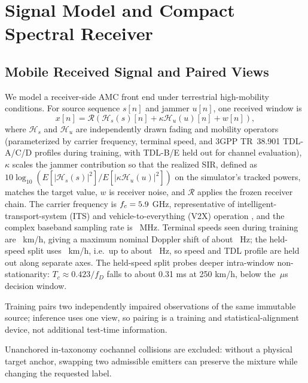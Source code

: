 \documentclass[letterpaper,journal]{IEEEtran}
\begin{document}
\section{Signal Model and Compact Spectral Receiver}
\subsection{Mobile Received Signal and Paired Views}
We model a receiver-side AMC front end under terrestrial high-mobility
conditions. For source sequence $s[n]$ and jammer $u[n]$, one received window is
\begin{equation}
x[n]=\mathcal{R}\!\left(\mathcal{H}_s(s)[n]
+\kappa\mathcal{H}_u(u)[n]+w[n]\right),
\label{eq:rx}
\end{equation}
where $\mathcal{H}_s$ and $\mathcal{H}_u$ are independently drawn fading and
mobility operators (parameterized by carrier frequency, terminal speed, and
3GPP TR~38.901 \cite{3gpp38901} TDL-A/C/D profiles during training, with
TDL-B/E held out for channel evaluation), $\kappa$ scales the jammer
contribution so that the realized SIR, defined as
$10\log_{10}\!\left(E[|\mathcal{H}_s(s)|^2]/E[|\kappa\mathcal{H}_u(u)|^2]\right)$
on the simulator's tracked powers, matches the target value, $w$ is
receiver noise, and $\mathcal{R}$ applies the frozen receiver chain. The
carrier frequency is $f_c=5.9$ GHz, representative of
intelligent-transport-system (ITS) and vehicle-to-everything (V2X) operation
\cite{3gpp37885}, and the complex baseband
sampling rate is \SampleRateMHz\ MHz. Terminal speeds seen during training are
\SeenSpeeds\ km/h, giving a maximum nominal Doppler shift of about
\MaxDopplerSeenHz\ Hz; the held-speed split uses \HeldSpeeds\ km/h, i.e.\ up to
about \MaxDopplerHeldHz\ Hz, so speed and TDL profile are held out along
separate axes. The held-speed split probes deeper intra-window
non-stationarity: $T_c\approx0.423/f_D$ falls to about 0.31 ms at 250 km/h,
below the \WindowMicroseconds\,$\mu$s decision window.

Training pairs two
independently impaired observations of the same immutable source; inference
uses one view, so pairing is a training and statistical-alignment device,
not additional test-time information.

Unanchored in-taxonomy cochannel collisions are excluded: without a physical
target anchor, swapping two admissible emitters can preserve the mixture
while changing the requested label.
\end{document}
